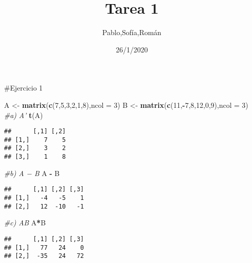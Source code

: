 \documentclass[
]{article}
\title{Tarea 1}
\author{Pablo,Sofía,Román}
\date{26/1/2020}
\newenvironment{Shaded}{\begin{snugshade}}{\end{snugshade}}
\newcommand{\CommentTok}[1]{\textcolor[rgb]{0.56,0.35,0.01}{\textit{#1}}}
\newcommand{\DataTypeTok}[1]{\textcolor[rgb]{0.13,0.29,0.53}{#1}}
\newcommand{\DecValTok}[1]{\textcolor[rgb]{0.00,0.00,0.81}{#1}}
\newcommand{\KeywordTok}[1]{\textcolor[rgb]{0.13,0.29,0.53}{\textbf{#1}}}
\newcommand{\NormalTok}[1]{#1}
\newcommand{\OperatorTok}[1]{\textcolor[rgb]{0.81,0.36,0.00}{\textbf{#1}}}
\newcommand{\StringTok}[1]{\textcolor[rgb]{0.31,0.60,0.02}{#1}}
\begin{document}
\maketitle

\#Ejercicio 1

\begin{Shaded}
\begin{Highlighting}[]
\NormalTok{  A <-}\StringTok{ }\KeywordTok{matrix}\NormalTok{(}\KeywordTok{c}\NormalTok{(}\DecValTok{7}\NormalTok{,}\DecValTok{5}\NormalTok{,}\DecValTok{3}\NormalTok{,}\DecValTok{2}\NormalTok{,}\DecValTok{1}\NormalTok{,}\DecValTok{8}\NormalTok{),}\DataTypeTok{ncol =} \DecValTok{3}\NormalTok{)}
\NormalTok{  B <-}\StringTok{ }\KeywordTok{matrix}\NormalTok{(}\KeywordTok{c}\NormalTok{(}\DecValTok{11}\NormalTok{,}\OperatorTok{-}\DecValTok{7}\NormalTok{,}\DecValTok{8}\NormalTok{,}\DecValTok{12}\NormalTok{,}\DecValTok{0}\NormalTok{,}\DecValTok{9}\NormalTok{),}\DataTypeTok{ncol =} \DecValTok{3}\NormalTok{)}
  \CommentTok{#a) A'}
    \KeywordTok{t}\NormalTok{(A)}
\end{Highlighting}
\end{Shaded}

\begin{verbatim}
##      [,1] [,2]
## [1,]    7    5
## [2,]    3    2
## [3,]    1    8
\end{verbatim}

\begin{Shaded}
\begin{Highlighting}[]
  \CommentTok{#b) A − B}
\NormalTok{    A }\OperatorTok{-}\StringTok{ }\NormalTok{B}
\end{Highlighting}
\end{Shaded}

\begin{verbatim}
##      [,1] [,2] [,3]
## [1,]   -4   -5    1
## [2,]   12  -10   -1
\end{verbatim}

\begin{Shaded}
\begin{Highlighting}[]
  \CommentTok{#c) AB  }
\NormalTok{    A}\OperatorTok{*}\NormalTok{B}
\end{Highlighting}
\end{Shaded}

\begin{verbatim}
##      [,1] [,2] [,3]
## [1,]   77   24    0
## [2,]  -35   24   72
\end{verbatim}

\begin{Shaded}
\end{Shaded}
\end{document}
